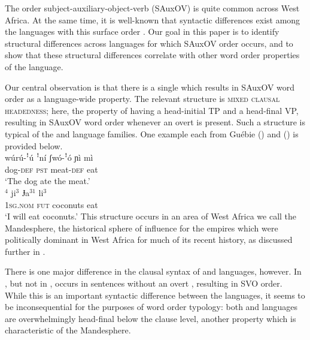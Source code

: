 \documentclass[output=paper,newtxmath,modfonts,nonflat,draftmode]{langsci/langscibook}
\begin{document}
The order subject-auxiliary-object-verb (SAuxOV) is quite common across West Africa. At the same time, it is well-known that syntactic differences exist among the languages with this surface order \citep{Creissels2005typology}. Our goal in this paper is to identify structural differences across languages for which SAuxOV order occurs, and to show that these structural differences correlate with other word order properties of the language.

Our central observation is that there is a single  which results in SAuxOV word order as a language-wide property. The relevant structure is \textsc{mixed clausal headedness}; here, the property of having a head-initial TP and a head-final VP, resulting in SAuxOV word order whenever an overt  is present. Such a structure is typical of the  and  language families. One example each from Guébie () and  () is provided below.
\ea 
\label{ex:1:sauxov}
\ea {} \\ 
\gll wúrú-ꜝú {ꜝ{ní}} {ʃwó-ꜝó} {{ɲì mì}}  \\
{dog}-\textsc{def} \textsc{pst} meat-\textsc{def} eat\\
\glt `The dog ate the meat.'  \label{ex:1b:sauxov}
\ex {} \\ 
$^{4}$ {ji}$^{3}$ {Ɉa}$^{31}$ {li}$^{3}$\\
\textsc{1sg}.\textsc{nom} \textsc{fut} coconuts eat \\
\glt `I will eat coconuts.'  \label{ex:1a:sauxov}
\z
\z
This structure occurs in an area of West Africa we call the Mandesphere, the historical sphere of influence for the  empires which were politically dominant in West Africa for much of its recent history, as discussed further in .

There is one major difference in the clausal syntax of  and  languages, however. In , but not in ,  occurs in sentences without an overt , resulting in SVO order. While this is an important syntactic difference between the languages, it seems to be inconsequential for the purposes of word order typology: both  and  languages are overwhelmingly head-final below the clause level, another property which is characteristic of the Mandesphere.
\end{document}
